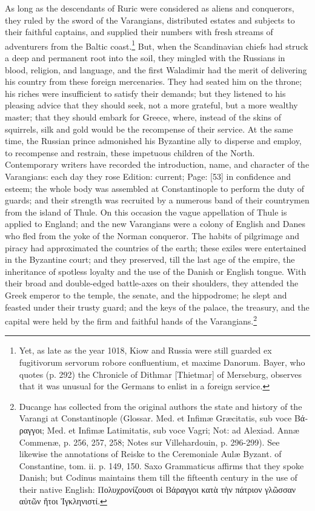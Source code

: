 As long as the descendants of Ruric were considered as aliens and conquerors, they ruled by the sword of the Varangians, distributed estates and subjects to their faithful captains, and supplied their numbers with fresh streams of adventurers from the Baltic coast.\footnote{Yet, as late as the year 1018, Kiow and Russia were still guarded ex fugitivorum servorum robore confluentium, et maxime Danorum. Bayer, who quotes (p. 292) the Chronicle of Dithmar [Thietmar] of Merseburg, observes that it was unusual for the Germans to enlist in a foreign service.} But, when the Scandinavian chiefs had struck a deep and permanent root into the soil, they mingled with the Russians in blood, religion, and language, and the first Waladimir had the merit of delivering his country from these foreign mercenaries. They had seated him on the throne; his riches were insufficient to satisfy their demands; but they listened to his pleasing advice that they should seek, not a more grateful, but a more wealthy master; that they should embark for Greece, where, instead of the skins of squirrels, silk and gold would be the recompense of their service. At the same time, the Russian prince admonished his Byzantine ally to disperse and employ, to recompense and restrain, these impetuous children of the North. Contemporary writers have recorded the introduction, name, and character of the Varangians: each day they rose Edition: current; Page: [53] in confidence and esteem; the whole body was assembled at Constantinople to perform the duty of guards; and their strength was recruited by a numerous band of their countrymen from the island of Thule. On this occasion the vague appellation of Thule is applied to England; and the new Varangians were a colony of English and Danes who fled from the yoke of the Norman conqueror. The habits of pilgrimage and piracy had approximated the countries of the earth; these exiles were entertained in the Byzantine court; and they preserved, till the last age of the empire, the inheritance of spotless loyalty and the use of the Danish or English tongue. With their broad and double-edged battle-axes on their shoulders, they attended the Greek emperor to the temple, the senate, and the hippodrome; he slept and feasted under their trusty guard; and the keys of the palace, the treasury, and the capital were held by the firm and faithful hands of the Varangians.\footnote{Ducange has collected from the original authors the state and history of the Varangi at Constantinople (Glossar. Med. et Infimæ Græcitatis, sub voce \textgreek{Βάραγγοι}; Med. et Infimæ Latimitatis, sub voce Vagri; Not: ad Alexiad. Annæ Commenæ, p. 256, 257, 258; Notes sur Villehardouin, p. 296-299). See likewise the annotations of Reiske to the Ceremoniale Aulæ Byzant. of Constantine, tom. ii. p. 149, 150. Saxo Grammaticus affirms that they spoke Danish; but Codinus maintains them till the fifteenth century in the use of their native English: \textgreek{Πολυχρονίζουσι ο\texthebrew{ἱ} Βάραγγοι κατ\texthebrew{ὰ} τ\texthebrew{ὴ}ν πάτριον γλ\texthebrew{ῶ}σσαν α\texthebrew{ὐ}τ\texthebrew{ῶ}ν \texthebrew{ἤ}τοι \texthebrew{Ἰ}γκληνιστί}.}


